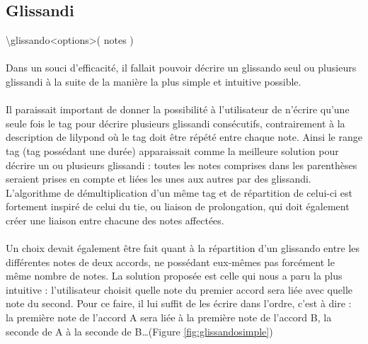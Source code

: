 \documentclass[a4paper,10pt,twocolumn]{article}
\newenvironment{code}
  {\fontfamily{pnc}\selectfont}{}
\begin{document}

\newpage

\subsection{Glissandi}

\begin{code}
\textbackslash{}glissando\textless{}options\textgreater{}( notes )
\end{code}
\\

\paragraph{}
Dans un souci d'efficacité, il fallait pouvoir décrire un glissando seul ou plusieurs glissandi à la suite de la manière la plus simple et intuitive possible. 

\paragraph{}
Il paraissait important de donner la possibilité à l'utilisateur de n'écrire qu'une seule fois le tag pour décrire plusieurs glissandi consécutifs, contrairement à la description de lilypond où le tag doit être répété entre chaque note. Ainsi le range tag (tag possédant une durée) apparaissait comme la meilleure solution pour décrire un ou plusieurs glissandi : toutes les notes comprises dans les parenthèses seraient prises en compte et liées les unes aux autres par des glissandi. L'algorithme de démultiplication d'un même tag et de répartition de celui-ci est fortement inspiré de celui du tie, ou liaison de prolongation, qui doit également créer une liaison entre chacune des notes affectées.

\paragraph{}
Un choix devait également être fait quant à la répartition d'un glissando entre les différentes notes de deux accords, ne possédant eux-mêmes pas forcément le même nombre de notes. La solution proposée est celle qui nous a paru la plus intuitive : l'utilisateur choisit quelle note du premier accord sera liée avec quelle note du second. Pour ce faire, il lui suffit de les écrire dans l'ordre, c'est à dire : la première note de l'accord A sera liée à la première note de l'accord B, la seconde de A à la seconde de B\dots (Figure \ref{fig:glissandosimple})
\end{document}
